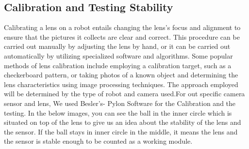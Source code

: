 \documentclass[11pt, a4paper, openany]{book}
\begin{document}
\subsection{Calibration and Testing Stability}
Calibrating a lens on a robot entails changing the lens's focus and alignment to ensure that the pictures it collects are clear and correct. This procedure can be carried out manually by adjusting the lens by hand, or it can be carried out automatically by utilizing specialized software and algorithms. Some popular methods of lens calibration include employing a calibration target, such as a checkerboard pattern, or taking photos of a known object and determining the lens characteristics using image processing techniques. The approach employed will be determined by the type of robot and camera used.For out specific camera sensor and lens, We used Besler's- Pylon Software for the Calibration and the testing. \newline
In the below images, you can see the ball in the inner circle which is situated on top of the lens to give us an idea about the stability of the lens and the sensor. If the ball stays in inner circle in the middle, it means the lens and the sensor is stable enough to be counted as a working module.
\end{document}

